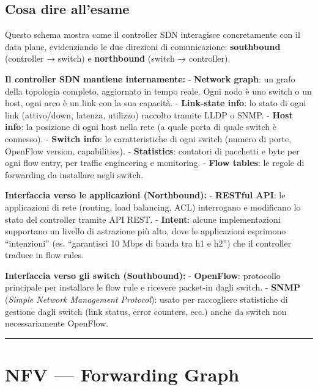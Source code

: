 \documentclass[
  italian,
  openany]{book}
\begin{document}
\subsection{Cosa dire all'esame}\label{cosa-dire-allesame-10}

Questo schema mostra come il controller SDN interagisce concretamente
con il data plane, evidenziando le due direzioni di comunicazione:
\textbf{southbound} (controller → switch) e \textbf{northbound} (switch
→ controller).

\textbf{Il controller SDN mantiene internamente:} - \textbf{Network
graph}: un grafo della topologia completo, aggiornato in tempo reale.
Ogni nodo è uno switch o un host, ogni arco è un link con la sua
capacità. - \textbf{Link-state info}: lo stato di ogni link
(attivo/down, latenza, utilizzo) raccolto tramite LLDP o SNMP. -
\textbf{Host info}: la posizione di ogni host nella rete (a quale porta
di quale switch è connesso). - \textbf{Switch info}: le caratteristiche
di ogni switch (numero di porte, OpenFlow version, capabilities). -
\textbf{Statistics}: contatori di pacchetti e byte per ogni flow entry,
per traffic engineering e monitoring. - \textbf{Flow tables}: le regole
di forwarding da installare negli switch.

\textbf{Interfaccia verso le applicazioni (Northbound):} -
\textbf{RESTful API}: le applicazioni di rete (routing, load balancing,
ACL) interrogano e modificano lo stato del controller tramite API REST.
- \textbf{Intent}: alcune implementazioni supportano un livello di
astrazione più alto, dove le applicazioni esprimono ``intenzioni'' (es.
``garantisci 10 Mbps di banda tra h1 e h2'') che il controller traduce
in flow rules.

\textbf{Interfaccia verso gli switch (Southbound):} - \textbf{OpenFlow}:
protocollo principale per installare le flow rule e ricevere packet-in
dagli switch. - \textbf{SNMP} (\emph{Simple Network Management
Protocol}): usato per raccogliere statistiche di gestione dagli switch
(link status, error counters, ecc.) anche da switch non necessariamente
OpenFlow.

\begin{center}\rule{0.5\linewidth}{0.5pt}\end{center}

\section{NFV --- Forwarding Graph}\label{nfv-forwarding-graph}
\end{document}
